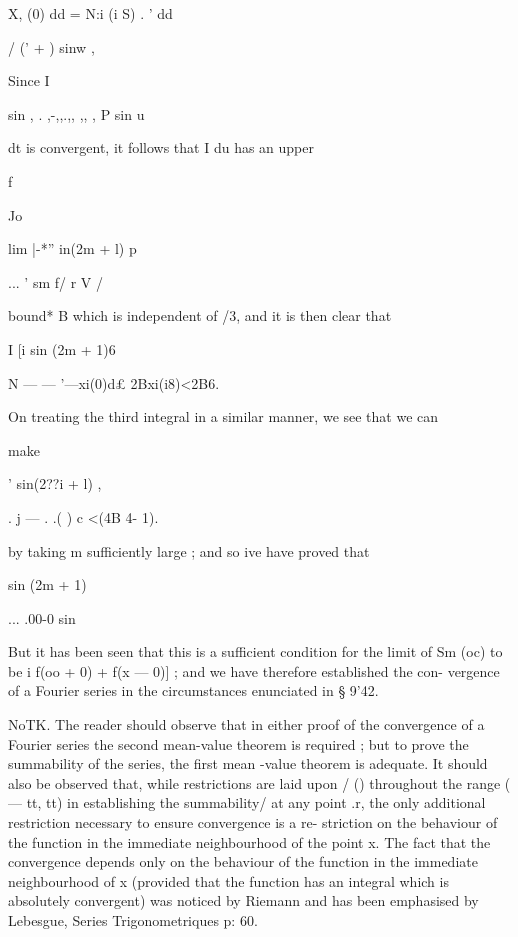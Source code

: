 X, (0) dd = N:i (i S) . ' dd

  / (' + ) sinw ,



Since I



sin , . ,-,,.,, ,, , P sin u



dt is convergent, it follows that I du has an upper



f

Jo



lim |-*'' in(2m + l) p

... ' sm f/ r V /



bound* B which is independent of /3, and it is then clear that

I [i sin (2m + 1)6

N — — '—xi(0)d£ 2Bxi(i8)<2B6.

On treating the third integral in a similar manner, we see that we can

make

  ' sin(2??i + l) ,

. j — . .( ) c <(4B 4- 1).

by taking m sufficiently large ; and so ive have proved that

sin (2m + 1)

... .00-0 sin

But it has been seen that this is a sufficient condition for the limit
of Sm (oc) to be i f(oo + 0) + f(x — 0)] ; and we have therefore
established the con- vergence of a Fourier series in the circumstances
enunciated in § 9'42.

NoTK. The reader should observe that in either proof of the
convergence of a Fourier series the second mean-value theorem is
required ; but to prove the summability of the series, the first mean
-value theorem is adequate. It should also be observed that, while
restrictions are laid upon / () throughout the range ( — tt, tt) in
establishing the summability/ at any point .r, the only additional
restriction necessary to ensure convergence is a re- striction on the
behaviour of the function in the immediate neighbourhood of the point
x. The fact that the convergence depends only on the behaviour of the
function in the immediate neighbourhood of x (provided that the
function has an integral which is absolutely convergent) was noticed
by Riemann and has been emphasised by Lebesgue, Series
Trigonometriques p: 60.


